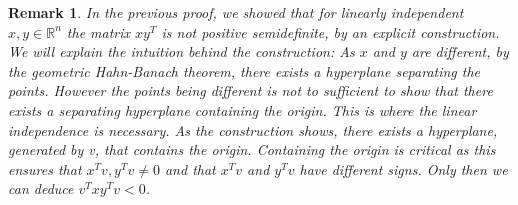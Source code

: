 \documentclass[12pt,a4paper]{article}
\theoremstyle{mythm}
\newtheorem*{rem}{Remark}
\newtheorem*{exa}{Example}
\begin{document}
\begin{rem}
In the previous proof, we showed that for linearly independent $ x,y \in \mathbb{R}  ^{ n }  $ the matrix $ x y ^T  $ is not positive semidefinite, by an explicit construction.
We will explain the intuition behind the construction:
As $ x $ and $ y $ are different, by the geometric Hahn-Banach theorem, there exists a hyperplane separating the points.
However the points being different is not to sufficient to show that there exists a separating hyperplane containing the origin.
This is where the linear independence is necessary. As the construction shows, there exists a hyperplane, generated by v, that contains the origin. Containing the origin is
critical as this ensures that $ x^Tv , y^Tv \neq 0 $ and that $ x^Tv $ and $ y^Tv $ have different signs. Only then we can deduce $ v^T xy^T v < 0 $.
\end{rem} 

\end{document}
